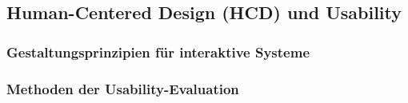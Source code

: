 \subsection{Human-Centered Design (HCD) und Usability}\label{subsec:hcd-usability}


\subsubsection{Gestaltungsprinzipien für interaktive Systeme}\label{subsubsec:gestaltungsprinzipien}





\subsubsection{Methoden der Usability-Evaluation}\label{subsubsec:usability-methoden}

